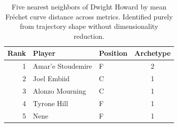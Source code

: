 \begin{table}[htbp]
  \centering\small
  \begin{tabular}{rllc}
    \toprule
    Rank & Player & Position & Archetype \\
    \midrule
    1 & Amar'e Stoudemire & F & 2 \\
    2 & Joel Embiid & C & 1 \\
    3 & Alonzo Mourning & C & 1 \\
    4 & Tyrone Hill & F & 1 \\
    5 & Nene & F & 1 \\
    \bottomrule
  \end{tabular}
  \caption{Five nearest neighbors of Dwight Howard by mean Fr\'{e}chet curve distance across metrics. Identified purely from trajectory shape without dimensionality reduction.}
  \label{tab:Dwight_Howard_frechet_curve_neighbors}
\end{table}

